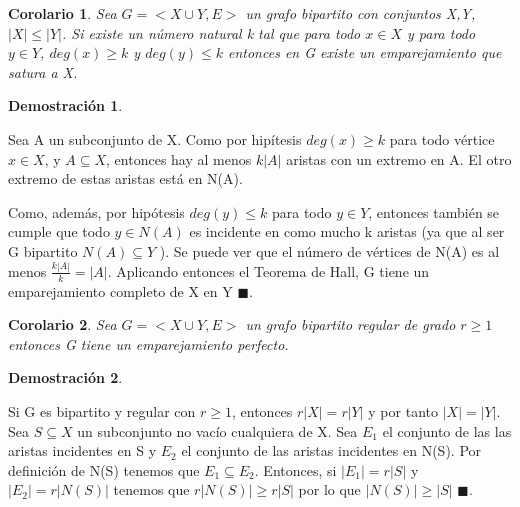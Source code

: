 \documentclass[a4paper,1pt]{report}
\newtheorem*{cor}{Corolario}
\newtheorem*{dem}{Demostración}
\begin{document}
\begin{cor}
 Sea $G=<X\cup Y, E>$ un grafo bipartito con conjuntos X,Y, $|X|\leq|Y|$. Si existe un número natural k tal que para todo $x\in X$ y para todo $y\in Y$, $deg(x)\geq k$ y $deg(y)\leq k$ entonces en G existe un emparejamiento que satura a X.
\end{cor}

\newpage

\begin{dem}
 
\end{dem}


Sea A un subconjunto de X. Como por hipítesis $deg(x)\geq k$ para todo vértice
$x \in X$, y $A \subseteq X$, entonces hay al menos $k|A|$ aristas con un extremo en A. 
El otro extremo de estas aristas está en N(A). 

Como, además, por hipótesis $deg(y) \leq k$ para todo $y \in Y $,
entonces también se cumple que todo $y \in N(A)$ es incidente en como mucho k aristas (ya
que al ser G bipartito $N(A) \subseteq Y$ ). Se puede ver que el número de vértices de N(A) es al menos $\frac{k|A|}{k} = |A|$. Aplicando entonces el Teorema de Hall, G tiene un emparejamiento completo de X en Y $\blacksquare$.

\begin{cor}
 Sea $G=<X\cup Y, E>$ un grafo bipartito regular de grado $r\geq 1$  entonces G
tiene un emparejamiento perfecto.
\end{cor}


\begin{dem}
 
\end{dem}


Si G es bipartito y regular con $r\geq 1$, entonces $r|X| = r|Y|$ y por tanto $|X|=|Y|$.
Sea $S \subseteq X$ un subconjunto no vacío cualquiera de X. Sea $E_1$ el conjunto de las
las aristas incidentes en S y $E_2$ el conjunto de las aristas incidentes en N(S). Por definición de N(S) tenemos que $E_1\subseteq E_2$. Entonces, si $|E_1|=r|S|$ y 
$|E_2|=r|N(S)|$ tenemos que $r|N(S)|\geq r|S|$ por lo que $|N(S)|\geq |S|$ $\blacksquare$.
\end{document}
